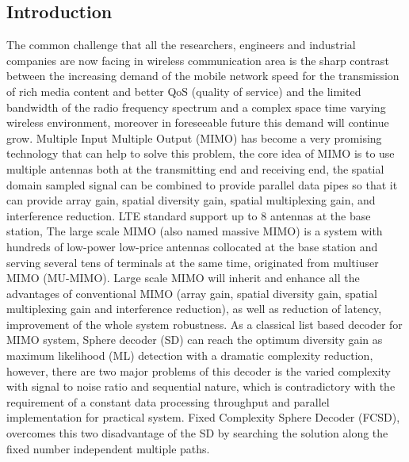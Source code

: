\documentclass[12pt,a4paper,final]{article}
\begin{document}
\begin{spacing}{2.5}
\section{Introduction}
 The common challenge that all the researchers, engineers and industrial companies are now facing in wireless communication area is the sharp contrast between the increasing demand of the mobile network speed for the transmission of rich media content and better QoS (quality of service) and the limited bandwidth of the radio frequency spectrum and a complex space time varying wireless environment, moreover in foreseeable future this demand will continue grow. Multiple Input Multiple Output (MIMO) has become a very promising technology that can help to solve this problem, the core idea of MIMO is to use multiple antennas both at the transmitting end and receiving end, the spatial domain sampled signal can be combined to provide parallel data pipes so that it can provide array gain, spatial diversity gain, spatial multiplexing gain, and interference reduction\cite{oestges2010mimo}. LTE standard support up to 8 antennas at the base station\cite{dahlman20103g}, The large scale MIMO (also named massive MIMO) is a system with hundreds of low-power low-price antennas collocated at the base station and serving several tens of terminals at the same time\cite{rusek2013scaling}, originated from multiuser MIMO (MU-MIMO)\cite{larsson2013massive}. Large scale MIMO will inherit and enhance all the advantages of conventional MIMO (array gain, spatial diversity gain, spatial multiplexing gain and interference reduction), as well as reduction of latency, improvement of the whole system robustness. 
 As a classical list based decoder for MIMO system, Sphere decoder (SD) can reach the optimum diversity gain as maximum likelihood (ML) detection with a dramatic complexity reduction\cite{viterbo1999universal}\cite{hassibi2005sphere}, however, there are two major problems of this decoder is the varied complexity with signal to noise ratio and sequential nature, which is contradictory with the requirement of a constant data processing throughput and parallel implementation for practical system. Fixed Complexity Sphere Decoder (FCSD), overcomes this two disadvantage of the SD by searching the solution along the fixed number independent multiple paths\cite{barbero2008fixing}.

\end{spacing}
\end{document}
